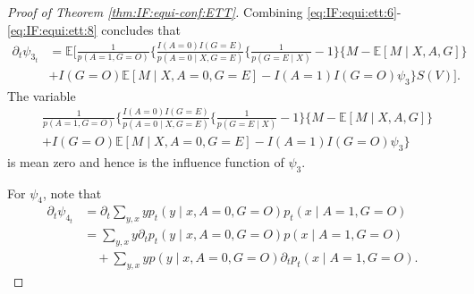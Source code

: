 \documentclass[10pt]{article}
\newcommand{\E}{\mathbb{E}}
\begin{document}
\begin{proof}[Proof of Theorem \ref{thm:IF:equi-conf:ETT}]
Combining \eqref{eq:IF:equi:ett:6}-\eqref{eq:IF:equi:ett:8} concludes that
\begin{align*}
\partial_t\psi_{3_t} 
&=\E\Big[
\frac{1}{p(A=1,G=O)}\Big\{
\frac{I(A=0)I(G=E)}{p(A=0\mid X,G=E)}\{\frac{1}{p(G=E\mid X)}-1\}\{M-\E[M\mid X,A,G]\}\\
&+I(G=O)\E[M\mid X,A=0,G=E]-I(A=1)I(G=O)\psi_3
\Big\}S(V)
\Big].	
\end{align*}
The variable
\begin{align*}
&\frac{1}{p(A=1,G=O)}\Big\{
\frac{I(A=0)I(G=E)}{p(A=0\mid X,G=E)}\{\frac{1}{p(G=E\mid X)}-1\}\{M-\E[M\mid X,A,G]\}\\
&+I(G=O)\E[M\mid X,A=0,G=E]-I(A=1)I(G=O)\psi_3
\Big\}
\end{align*}
is mean zero and hence is the influence function of $\psi_3$.

For $\psi_4$, note that
\begin{equation}
\label{eq:IF:equi:ett:9}
\begin{aligned}
\partial_t\psi_{4_t} 
&=\partial_t \sum_{y,x} y p_t(y\mid x,A=0,G=O)p_t(x\mid A=1,G=O)\\
&= \sum_{y,x} y \partial_t p_t(y\mid x,A=0,G=O)p(x\mid A=1,G=O)\\
&\quad+\sum_{y,x} y p(y\mid x,A=0,G=O)\partial_t p_t(x\mid A=1,G=O).
\end{aligned}
\end{equation}


\end{proof}
\end{document}
